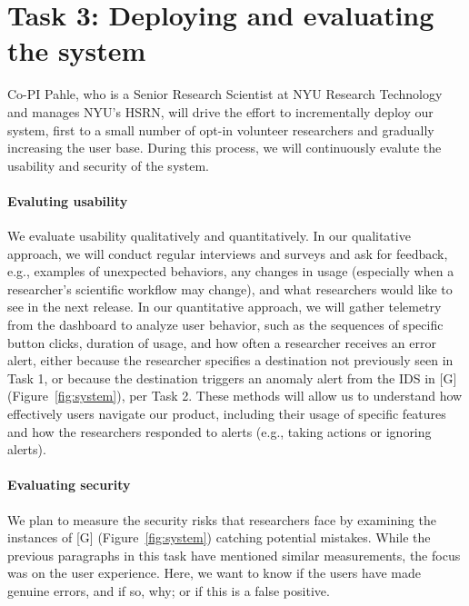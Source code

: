 \section{Task 3: Deploying and evaluating the system}

Co-PI Pahle, who is a Senior Research Scientist at NYU Research Technology and manages NYU's HSRN, will drive the effort to incrementally deploy our system, first to a small number of opt-in volunteer researchers and gradually increasing the user base. During this process, we will continuously evalute the usability and security of the system.

\paragraph{Evaluting usability}
We evaluate usability qualitatively and quantitatively. In our qualitative approach, we will conduct regular interviews and surveys and ask for feedback, e.g., examples of unexpected behaviors, any changes in usage (especially when a researcher's scientific workflow may change), and what researchers would like to see in the next release.
In our quantitative approach, we will gather telemetry from the dashboard to analyze user behavior, such as the sequences of specific button clicks, duration of usage, and how often a researcher receives an error alert, either because the researcher specifies a destination not previously seen in Task 1, or because the destination triggers an anomaly alert from the IDS in [G] (Figure~\ref{fig:system}), per Task 2.
These methods will allow us to understand how effectively users navigate our product, including their usage of specific features and how the researchers responded to alerts (e.g., taking actions or ignoring alerts).




\paragraph{Evaluating security}
We plan to measure the security risks that researchers face by examining the instances of [G] (Figure~\ref{fig:system}) catching potential mistakes. While the previous paragraphs in this task have mentioned similar measurements, the focus was on the user experience. Here, we want to know if the users have made genuine errors, and if so, why; or if this is a false positive.

